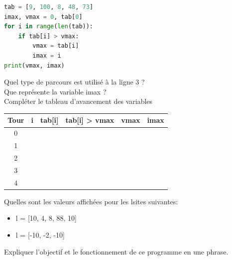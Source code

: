\begin{Exercise}[title={Trouver un maximum}]

\begin{lstlisting}[style=pythonstyle, language=Python]
tab = [9, 100, 8, 48, 73]
imax, vmax = 0, tab[0]
for i in range(len(tab)):
    if tab[i] > vmax:
        vmax = tab[i]
        imax = i
print(vmax, imax) 
\end{lstlisting}

\Question Quel type de parcours est utilisé à la ligne 3 ?\\
\Question Que représente la variable imax ? \\
\Question Compléter le tableau d'avancement des variables\\
 \begin{center}
\large
\begin{tabular}{c|c|c|c|c|c|}
\textbf{Tour} & \textbf{i} & \textbf{tab[i]} & \textbf{tab[i] > vmax} & \textbf{vmax} & \textbf{imax } \\
\hline
0 &  &  &  & &\\
1 &  &  &  & &\\
2 &  &  &  & &\\
3 &  &  &  & &\\
4 &  &  &  & &
\end{tabular}
\end{center}

\Question Quelles sont les valeurs affichées pour les lsites suivantes:
\begin{itemize}
 \item l = [10, 4, 8, 88, 10]
 \item l = [-10, -2, -10]
\end{itemize}

\Question Expliquer l'objectif et le fonctionnement de ce programme en une phrase.\\
\end{Exercise}
